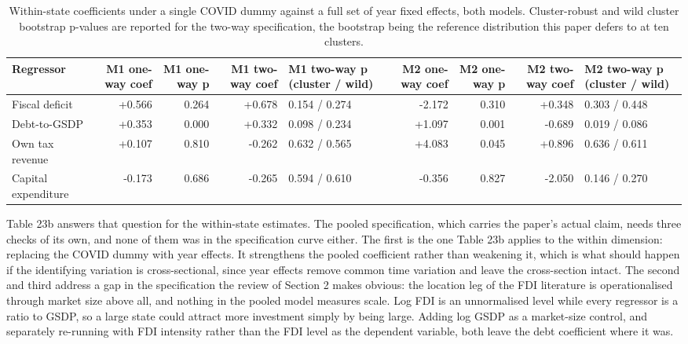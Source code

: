 \documentclass[12pt,a4paper]{article}
\begin{document}
\begin{table}[H]
\centering
\addtocounter{table}{-1}\renewcommand{\thetable}{\arabic{table}b}
\caption{Within-state coefficients under a single COVID dummy against a full set of year fixed effects, both models. Cluster-robust and wild cluster bootstrap p-values are reported for the two-way specification, the bootstrap being the reference distribution this paper defers to at ten clusters.}
\label{tab:23b}
\renewcommand{\thetable}{\arabic{table}}
\footnotesize
\begin{adjustbox}{max width=\textwidth}
\begin{tabular}{@{}lrrrlrrrl@{}}
\toprule
Regressor & M1 one-way coef & M1 one-way p & M1 two-way coef & M1 two-way p (cluster / wild) & M2 one-way coef & M2 one-way p & M2 two-way coef & M2 two-way p (cluster / wild) \\
\midrule
Fiscal deficit & +0.566 & 0.264 & +0.678 & 0.154 / 0.274 & -2.172 & 0.310 & +0.348 & 0.303 / 0.448 \\
Debt-to-GSDP & +0.353 & 0.000 & +0.332 & 0.098 / 0.234 & +1.097 & 0.001 & -0.689 & 0.019 / 0.086 \\
Own tax revenue & +0.107 & 0.810 & -0.262 & 0.632 / 0.565 & +4.083 & 0.045 & +0.896 & 0.636 / 0.611 \\
Capital expenditure & -0.173 & 0.686 & -0.265 & 0.594 / 0.610 & -0.356 & 0.827 & -2.050 & 0.146 / 0.270 \\
\bottomrule
\end{tabular}
\end{adjustbox}
\end{table}

Table 23b answers that question for the within-state estimates. The pooled specification, which carries the paper's actual claim, needs three checks of its own, and none of them was in the specification curve either. The first is the one Table 23b applies to the within dimension: replacing the COVID dummy with year effects. It strengthens the pooled coefficient rather than weakening it, which is what should happen if the identifying variation is cross-sectional, since year effects remove common time variation and leave the cross-section intact. The second and third address a gap in the specification the review of Section 2 makes obvious: the location leg of the FDI literature is operationalised through market size above all, and nothing in the pooled model measures scale. Log FDI is an unnormalised level while every regressor is a ratio to GSDP, so a large state could attract more investment simply by being large. Adding log GSDP as a market-size control, and separately re-running with FDI intensity rather than the FDI level as the dependent variable, both leave the debt coefficient where it was.
\end{document}

